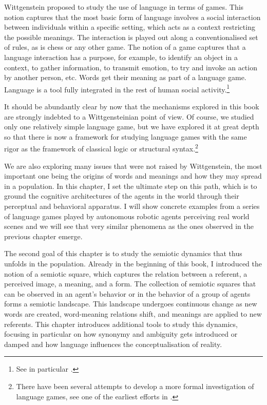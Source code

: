 Wittgenstein proposed to study the use of language in terms of 
games. This notion captures that the most basic form of
language involves a social interaction between individuals
within a specific setting, which acts as a context restricting
the possible meanings. The interaction is played out 
along a conventionalised set of rules, as is chess or any
other game. The notion of a game captures
that a language interaction has a purpose, for example,
to identify an object in a context, to gather 
information, to transmit emotion, to try and
invoke an action by another person, etc. Words get \enlargethispage{2\baselineskip}
their meaning as part of a language game. Language is a tool 
fully integrated in the rest of human social activity.\footnote{See in particular \cite{Wittgenstein:1953}.}

It should be abundantly clear by now that the mechanisms explored
in this book are strongly indebted to a Wittgensteinian 
point of view. Of course, we studied only one relatively 
simple language game, but we have explored it at
great depth so that there is now a framework for
studying language games with the same rigor as 
the framework of classical logic or structural syntax.\footnote{There have been several attempts to develop a 
more formal investigation of language games, see one of the 
earliest efforts in \cite{Hintikka:1998}.}

We are also exploring many issues that were not raised
by Wittgenstein, the most important one being the origins 
of words and meanings and how they may spread in 
a population. In this chapter, I set the ultimate 
step on this path, which is 
to ground the cognitive architectures of the agents
in the world through their perceptual and behavioral
apparatus. I will show concrete examples from a
series of language games played by autonomous 
robotic agents perceiving real world scenes
and we will see that very similar
phenomena as the ones observed in the previous chapter
emerge. 

The second goal of this chapter is to study the semiotic
dynamics that thus unfolds in the population. 
Already in the beginning of this book, I introduced the 
notion of a semiotic square, which captures the relation
between a referent, a perceived image, 
a meaning, and a form. The collection 
of semiotic squares that can be observed in an agent's
behavior or in the behavior of a group of agents
forms a semiotic landscape. This landscape undergoes
continuous change as new words are created, word-meaning relations
shift, and meanings are applied to new referents. 
This chapter introduces additional tools to study this dynamics, 
focusing in particular on how synonymy and ambiguity gets
introduced or damped and how language influences the 
conceptualisation of reality. 

